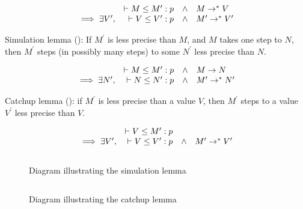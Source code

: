\newcommand\wwedge{\quad\wedge\quad}

\[
\begin{array}{rrcl}
  & \vdash M \le M^\prime : p & \wedge & M \to^\ast V
\\ \implies \exists V^\prime , & \vdash V \le V^\prime : p & \wedge & M^\prime \to^\ast V^\prime
\end{array}
\]

Simulation lemma (): If $M^\prime$ is less precise than $M$, and $M$ takes one step to $N$,
then $M^\prime$ steps (in possibly many steps) to some $N^\prime$ less precise than $N$.

\[
\begin{array}{rrcl}
  & \vdash M \le M^\prime : p & \wedge & M \to N
\\ \implies \exists N^\prime , & \vdash N \le N^\prime : p & \wedge & M^\prime \to^\ast N^\prime
\end{array}
\]

Catchup lemma (): if $M^\prime$ is less precise than a value $V$, then $M^\prime$ steps
to a value $V^\prime$ less precise than $V$.

\[
\begin{array}{rrcl}
  & \vdash V \le M^\prime : p & &
\\ \implies \exists V^\prime , & \vdash V \le V^\prime : p & \wedge & M^\prime \to^\ast V^\prime
\end{array}
\]

\begin{figure}
$$

$$
\caption{Diagram illustrating the simulation lemma}
\label{fig:sim}
\end{figure}

\begin{figure}
$$  $$
\caption{Diagram illustrating the catchup lemma}
\label{fig:catchup}
\end{figure}
